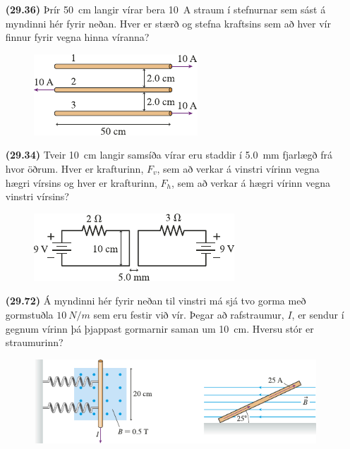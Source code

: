 \begin{enumerate}[label = \textbf{(\alph*)}]

\item[\textbf{(29.36)}] Þrír \SI{50}{cm} langir vírar bera \SI{10}{A} straum í stefnurnar sem sást á myndinni hér fyrir neðan. Hver er stærð og stefna kraftsins sem að hver vír finnur fyrir vegna hinna víranna?

\begin{figure}[H]
    \centering
    \includegraphics[scale = 1.25]{figures/rk2936.pdf}
\end{figure}

\item[\textbf{(29.34)}] Tveir \SI{10}{cm} langir samsíða vírar eru staddir í \SI{5.0}{mm} fjarlægð frá hvor öðrum. Hver er krafturinn, $F_v$, sem að verkar á vinstri vírinn vegna hægri vírsins og hver er krafturinn, $F_h$, sem að verkar á hægri vírinn vegna vinstri vírsins? 

\begin{figure}[H]
    \centering
    \includegraphics[scale = 1.25]{figures/rk2934.pdf}
\end{figure}

\item[\textbf{(29.72)}] Á myndinni hér fyrir neðan til vinstri má sjá tvo gorma með gormstuðla $\SI{10}{N/m}$ sem eru festir við vír. Þegar að rafstraumur, $I$, er sendur í gegnum vírinn þá þjappast gormarnir saman um \SI{10}{cm}. Hversu stór er straumurinn? 

\begin{figure}[H]
    \centering
    \includegraphics[scale = 1.25]{figures/rk2973.pdf}
\end{figure}



\end{enumerate}
